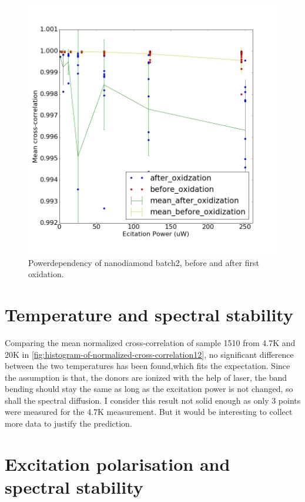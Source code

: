  
\begin{figure}[h]
\centering
\includegraphics[width=0.7\linewidth]{Figures/pic/powerdependencybeforeafteroxidation}
\caption{Powerdependency of nanodiamond batch2, before and after first oxidation.}
\label{fig:powerdependencybeforeafteroxidation}
\end{figure}

\section{Temperature and spectral stability}
Comparing the mean normalized cross-correlation of sample 1510 from 4.7K and 20K in \ref{fig:histogram-of-normalized-cross-correlation12}, no significant difference between the two temperatures has been found,which fits the expectation. Since the assumption is that, the donors are ionized with the help of laser, the band bending should stay the same as long as the excitation power is not changed, so shall the spectral diffusion.
I consider this result not solid enough as only 3 points were measured for the 4.7K measurement. But it would be interesting to collect more data to justify the prediction.

\section{Excitation polarisation and spectral stability}

